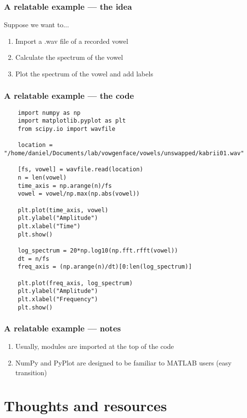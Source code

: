 \documentclass{beamer}\usepackage[]{graphicx}\usepackage[]{color}
\begin{document}
\begin{frame}
\frametitle{A relatable example --- the idea}
Suppose we want to...
	\begin{enumerate}
		\item Import a .wav file of a recorded vowel 

		\item Calculate the spectrum of the vowel 

		\item Plot the spectrum of the vowel and add labels
	\end{enumerate}
\end{frame}

\begin{frame}[fragile]
\frametitle{A relatable example --- the code}
\begin{lstlisting}
	import numpy as np
	import matplotlib.pyplot as plt
	from scipy.io import wavfile

	location = "/home/daniel/Documents/lab/vowgenface/vowels/unswapped/kabrii01.wav"

	[fs, vowel] = wavfile.read(location) 
	n = len(vowel)
	time_axis = np.arange(n)/fs
	vowel = vowel/np.max(np.abs(vowel))

	plt.plot(time_axis, vowel)
	plt.ylabel("Amplitude")
	plt.xlabel("Time")
	plt.show()

	log_spectrum = 20*np.log10(np.fft.rfft(vowel))
	dt = n/fs
	freq_axis = (np.arange(n)/dt)[0:len(log_spectrum)]

	plt.plot(freq_axis, log_spectrum)
	plt.ylabel("Amplitude")
	plt.xlabel("Frequency")
	plt.show()
\end{lstlisting}
\end{frame}

\begin{frame}
\frametitle{A relatable example --- notes}
	\begin{enumerate}
		\item Usually, modules are imported at the top of the code

		\item NumPy and PyPlot are designed to be familiar to MATLAB users (easy transition)
	\end{enumerate}
\end{frame}

\section{Thoughts and resources}
\end{document}
